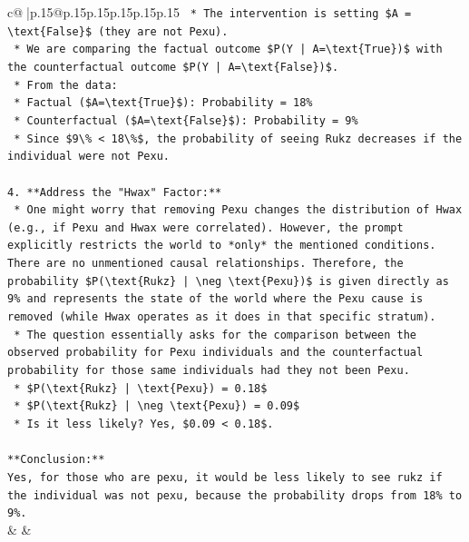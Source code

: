 \documentclass{article}
\begin{document}
{\begin{supertabular}{c@{$\;$}|p{.15\linewidth}@{}p{.15\linewidth}p{.15\linewidth}p{.15\linewidth}p{.15\linewidth}p{.15\linewidth}}
{{{\texttt{    *   The intervention is setting \$A = \textbackslash{}text\{False\}\$ (they are not Pexu).} \\
\texttt{    *   We are comparing the factual outcome \$P(Y | A=\textbackslash{}text\{True\})\$ with the counterfactual outcome \$P(Y | A=\textbackslash{}text\{False\})\$.} \\
\texttt{    *   From the data:} \\
\texttt{        *   Factual (\$A=\textbackslash{}text\{True\}\$): Probability = 18\%} \\
\texttt{        *   Counterfactual (\$A=\textbackslash{}text\{False\}\$): Probability = 9\%} \\
\texttt{    *   Since \$9\textbackslash{}\% < 18\textbackslash{}\%\$, the probability of seeing Rukz decreases if the individual were not Pexu.} \\
\\ 
\texttt{4.  **Address the "Hwax" Factor:**} \\
\texttt{    *   One might worry that removing Pexu changes the distribution of Hwax (e.g., if Pexu and Hwax were correlated). However, the prompt explicitly restricts the world to *only* the mentioned conditions. There are no unmentioned causal relationships. Therefore, the probability \$P(\textbackslash{}text\{Rukz\} | \textbackslash{}neg \textbackslash{}text\{Pexu\})\$ is given directly as 9\% and represents the state of the world where the Pexu cause is removed (while Hwax operates as it does in that specific stratum).} \\
\texttt{    *   The question essentially asks for the comparison between the observed probability for Pexu individuals and the counterfactual probability for those same individuals had they not been Pexu.} \\
\texttt{    *   \$P(\textbackslash{}text\{Rukz\} | \textbackslash{}text\{Pexu\}) = 0.18\$} \\
\texttt{    *   \$P(\textbackslash{}text\{Rukz\} | \textbackslash{}neg \textbackslash{}text\{Pexu\}) = 0.09\$} \\
\texttt{    *   Is it less likely? Yes, \$0.09 < 0.18\$.} \\
\\ 
\texttt{**Conclusion:**} \\
\texttt{Yes, for those who are pexu, it would be less likely to see rukz if the individual was not pexu, because the probability drops from 18\% to 9\%.} \\
            }
        }
    }
    & & \\ \\


\end{supertabular}}
\end{document}
